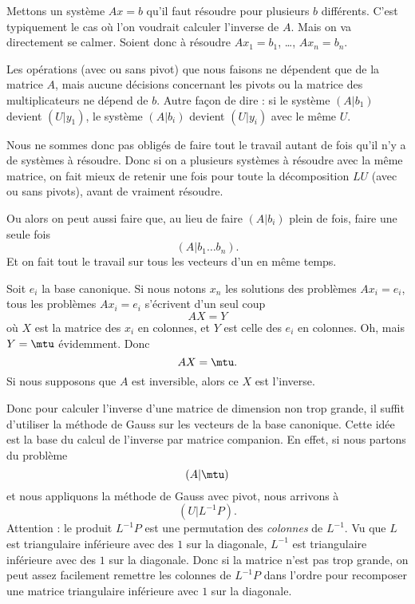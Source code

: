 Mettons un système \( Ax=b\) qu'il faut résoudre pour plusieurs \( b\) différents. C'est typiquement le cas où l'on voudrait calculer l'inverse de \( A\). Mais on va directement se calmer. Soient donc à résoudre \( Ax_1=b_1\), \ldots, \( Ax_n=b_n\).

Les opérations (avec ou sans pivot) que nous faisons ne dépendent que de la matrice \( A\), mais aucune décisions concernant les pivots ou la matrice des multiplicateurs ne dépend de \( b\). Autre façon de dire : si le système \(  (A|b_1)  \) devient \( (U|y_1)\), le système \( (A|b_i)\) devient \( (U|y_i)\) avec le même \( U\).

Nous ne sommes donc pas obligés de faire tout le travail autant de fois qu'il n'y a de systèmes à résoudre. Donc si on a plusieurs systèmes à résoudre avec la même matrice, on fait mieux de retenir une fois pour toute la décomposition \( LU\) (avec ou sans pivots), avant de vraiment résoudre.

Ou alors on peut aussi faire que, au lieu de faire \( (A|b_i)\) plein de fois, faire une seule fois
\begin{equation}
	(A|b_1\ldots b_n).
\end{equation}
Et on fait tout le travail sur tous les vecteurs d'un en même temps.

Soit \( {e_i}\) la base canonique. Si nous notons \( x_n\) les solutions des problèmes \( Ax_i=e_i\), tous les problèmes \( Ax_i=e_i\) s'écrivent d'un seul coup
\begin{equation}
	AX=Y
\end{equation}
où \( X\) est la matrice des \( x_i\) en colonnes, et \( Y\) est celle des \( e_i\) en colonnes. Oh, mais \( Y=\mtu\) évidemment. Donc
\begin{equation}
	AX=\mtu.
\end{equation}
Si nous supposons que \( A\) est inversible, alors ce \( X\) est l'inverse.

Donc pour calculer l'inverse d'une matrice de dimension non trop grande, il suffit d'utiliser la méthode de Gauss sur les vecteurs de la base canonique. Cette idée est la base du calcul de l'inverse par matrice companion. En effet, si nous partons du problème
\begin{equation}
	(A|\mtu)
\end{equation}
et nous appliquons la méthode de Gauss avec pivot, nous arrivons à
\begin{equation}
	(U|L^{-1} P).
\end{equation}
Attention : le produit \( L^{-1}P\) est une permutation des \emph{colonnes} de \( L^{-1}\). Vu que \( L\) est triangulaire inférieure avec des \( 1\) sur la diagonale, \( L^{-1}\) est triangulaire inférieure avec des \( 1\) sur la diagonale. Donc si la matrice n'est pas trop grande, on peut assez facilement remettre les colonnes de \( L^{-1}P\) dans l'ordre pour recomposer une matrice triangulaire inférieure avec \( 1\) sur la diagonale.

